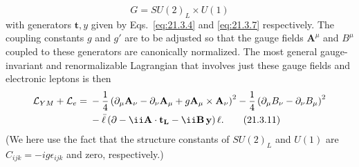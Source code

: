 \begin{equation}
G=SU(2)_L\times U(1)
\tag{21.3.10}\label{eq:21.3.10}
\end{equation}
with generators $\mathbf{t},y$ given by Eqs.~\eqref{eq:21.3.4} and \eqref{eq:21.3.7} respectively. The coupling constants $g$ and $g'$ are to be adjusted so that the gauge fields $\mathbf{A}^\mu$ and $B^\mu$ coupled to these generators are canonically normalized. The most general gauge-invariant and renormalizable Lagrangian that involves just these gauge fields and electronic leptons is then
\begin{align}
\mathcal{L}_{YM}+\mathcal{L}_e
={}&-\frac{1}{4}
\left(\partial_\mu\mathbf{A}_\nu-\partial_\nu\mathbf{A}_\mu
+g\mathbf{A}_\mu\mathbin{\times}\mathbf{A}_\nu\right)^2
-\frac{1}{4}\left(\partial_\mu B_\nu-\partial_\nu B_\mu\right)^2
\notag\\
&-\bar\ell\left(\sl{\partial}-\ii\mathbf{\sl A}\cdot\mathbf{t}_L-\ii\sl B\,y\right)\ell.
\tag{21.3.11}\label{eq:21.3.11}
\end{align}
(We here use the fact that the structure constants of $SU(2)_L$ and $U(1)$ are $C_{ijk}=-ig\epsilon_{ijk}$ and zero, respectively.)

